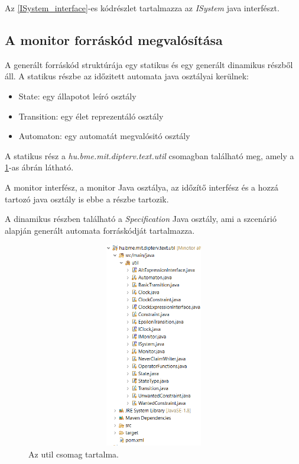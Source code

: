 Az \ref{ISystem_interface}-es kódrészlet tartalmazza az \textit{ISystem} java interfészt.

\subsection{A monitor forráskód megvalósítása}
A generált forráskód struktúrája egy statikus és egy generált dinamikus részből áll.
A statikus részbe az időzitett automata java osztályai kerülnek:
\begin{itemize}
    \item State: egy állapotot leíró osztály
    \item Transition: egy élet reprezentáló osztály
    \item Automaton: egy automatát megvalósitó osztály
\end{itemize}
A statikus rész a \textit{hu.bme.mit.dipterv.text.util} csomagban található meg, amely a \ref{util_csomag}-as ábrán látható.

A monitor interfész, a monitor Java osztálya, az időzítő interfész és a hozzá tartozó java osztály is ebbe a részbe tartozik.

A dinamikus részben található a \textit{Specification} Java osztály, ami a szcenárió alapján generált automata forráskódját tartalmazza.

\begin{figure}[!ht]
    \centering
    \includegraphics[width=150mm, height= 9cm, keepaspectratio]{figures/util_csomag.png}
    \caption{Az util csomag tartalma.}
	\label{util_csomag}
\end{figure}

